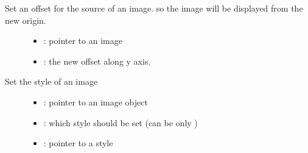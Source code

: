 \documentclass[letterpaper,10pt,english]{sphinxmanual}
\begin{document}

\begin{fulllineitems}
\label{\detokenize{object-types/img:_CPPv419lv_img_set_offset_yP8lv_obj_t10lv_coord_t}}%
\pysigstartmultiline
{}\label{\detokenize{object-types/img:lv__img_8h_1aed8bdd681e37a9cc67a3250476b1b4a0}}%
\pysigstopmultiline
Set an offset for the source of an image. so the image will be displayed from the new origin. \begin{description}
\item[{}] \leavevmode\begin{itemize}
\item {} 
: pointer to an image 

\item {} 
: the new offset along y axis. 

\end{itemize}

\end{description}


\end{fulllineitems}


\begin{fulllineitems}
\label{\detokenize{object-types/img:_CPPv416lv_img_set_styleP8lv_obj_t14lv_img_style_tPK10lv_style_t}}%
\pysigstartmultiline
{}\label{\detokenize{object-types/img:lv__img_8h_1a3eb631627f833fc8b81233e6077a322f}}%
\pysigstopmultiline
Set the style of an image \begin{description}
\item[{}] \leavevmode\begin{itemize}
\item {} 
: pointer to an image object 

\item {} 
: which style should be set (can be only ) 

\item {} 
: pointer to a style 

\end{itemize}

\end{description}


\end{fulllineitems}
\end{document}
